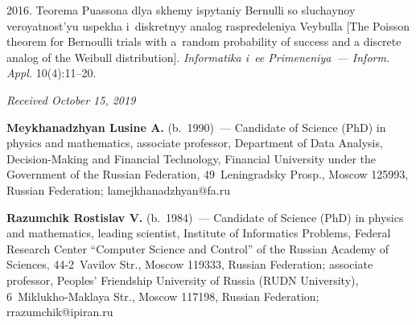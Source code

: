 \begin{multicols}{2}
{{\begin{thebibliography}{99}
 2016.
Teorema Puassona dlya skhemy ispytaniy Bernulli so sluchaynoy veroyatnost'yu 
uspekha i~diskretnyy analog raspredeleniya Veybulla [The Poisson theorem 
for Bernoulli trials with 
a~random probability of success and a discrete analog of the Weibull distribution].
\textit{Informatika i~ee Primeneniya~--- Inform. Appl.} 10(4):11--20.
\end{thebibliography}

 }
 }

\end{multicols}


\hfill{\small\textit{Received October 15, 2019}}



\Contr

\noindent
\textbf{Meykhanadzhyan Lusine A.} (b.\ 1990)~---
Candidate of Science (PhD) in physics and
mathematics, associate professor,
Department of Data Analysis, Decision-Making and Financial Technology,
Financial University under the Government of the Russian Federation,
49~Leningradsky Prosp., Moscow 125993, Russian Federation;
\mbox{lamejkhanadzhyan@fa.ru}

\vspace*{3pt}

\noindent
\textbf{Razumchik Rostislav V.} (b.\ 1984)~---
Candidate of Science (PhD) in physics and mathematics, leading scientist,
Institute of Informatics Problems, Federal Research Center 
``Computer Science and Control'' of the Russian Academy of Sciences, 
44-2~Vavilov Str., Moscow 119333, Russian Federation; associate professor,
 Peoples' Friendship University of Russia (RUDN University), 
 6~Miklukho-Maklaya Str., Moscow 117198, Russian Federation; \mbox{rrazumchik@ipiran.ru}



\label{end\stat}

\renewcommand{\bibname}{\protect\rm Литература}  